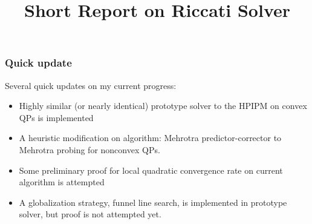 \documentclass[10pt,aspectratio=1610]{beamer} %
\title[Short Report on Riccati Solver]{\huge Short Report on Riccati Solver}
\begin{document}
\InsertTitle

\begin{frame}
    \frametitle{Quick update}
    Several quick updates on my current progress:
    \begin{itemize}
        \item Highly similar (or nearly identical) prototype solver to the HPIPM on convex QPs is implemented
        \item A heuristic modification on algorithm: Mehrotra predictor-corrector to Mehrotra probing for nonconvex QPs.
        \item Some preliminary proof for local quadratic convergence rate on current algorithm is attempted
        \item A globalization strategy, funnel line search, is implemented in prototype solver, but proof is not attempted yet.
    \end{itemize}
\end{frame}
\end{document}
